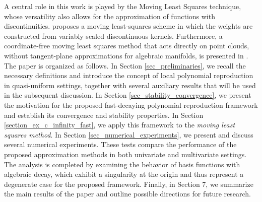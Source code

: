 \documentclass{drna}
\begin{document}
A central role in this work is played by the Moving Least Squares technique, whose versatility also allows for the approximation of functions with discontinuities.  \cite{demarchi_2023a} proposes a moving least-squares scheme in which the weights are constructed from variably scaled discontinuous kernels. Furthermore, a coordinate-free moving least squares method that acts directly on point clouds, without tangent-plane approximations for algebraic manifolds, is presented in \cite{Hangelbroek2026}.
\\
The paper is organized as follows. In Section \ref{sec_preliminaries}, we recall the necessary definitions and introduce the concept of local polynomial reproduction in quasi-uniform settings, together with several auxiliary results that will be used in the subsequent discussion. In Section \ref{sec_stability_convergence}, we present the motivation for the proposed fast-decaying polynomial reproduction framework and establish its convergence and stability properties. In Section \ref{section_ex_c_infinity_fast}, we apply this framework to the \textit{moving least squares method}. 
In Section \ref{sec_numerical_experiments}, we present and discuss several numerical experiments. These tests compare the performance of the proposed approximation methods in both univariate and multivariate settings.
The analysis is completed by examining the behavior of basis functions with algebraic decay, which exhibit a singularity at the origin and thus represent a degenerate case for the proposed framework. Finally, in Section 7, we summarize the main results of the paper and outline possible directions for future research.
\end{document}
